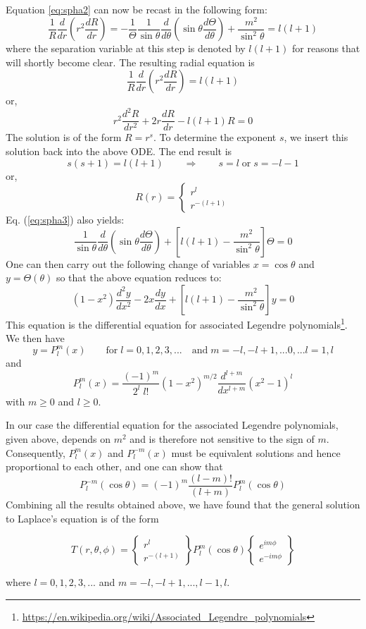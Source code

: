 Equation \ref{eq:spha2} can now be recast in the following form:
\begin{equation}
 \frac{1}{R} \frac{d}{dr} \left( r^2 \frac{dR}{dr} \right) 
= 
-\frac{1}{\Theta}\frac{1}{\sin\theta} \frac{d}{d\theta} \left( \sin \theta \frac{d\Theta}{d\theta} \right) 
+\frac{m^2}{\sin^2\theta} = l(l+1) \label{eq:spha3}
\end{equation}
where the separation variable at this step is denoted by $l(l + 1)$ for reasons that will shortly
become clear.
The resulting radial equation is 
\[
\frac{1}{R} \frac{d}{dr} \left( r^2 \frac{dR}{dr} \right)  = l(l+1)
\]
or, 
\[
r^2 \frac{d^2R}{dr^2} + 2 r \frac{dR}{dr} - l(l+1)R =0
\]
The solution is of the form $R=r^s$. To determine the exponent $s$, 
we insert this solution back into the above ODE. The end result is
\[
s(s+1)=l(l+1) \qquad \Rightarrow \qquad s=l \; \text{or} \; s=-l-1
\]
or, 
\[
R(r) = 
\left\{
\begin{array}{c}
r^l \\ r^{-(l+1)}
\end{array}
\right.
\]
Eq. (\ref{eq:spha3}) also yields:
\[
\frac{1}{\sin\theta} \frac{d}{d\theta} \left( \sin\theta \frac{d\Theta}{d\theta} \right) 
+
\left[ l(l+1) - \frac{m^2}{\sin^2\theta} \right] \Theta = 0
\]
One can then carry out the following change of variables $x=\cos\theta$ and $y=\Theta(\theta)$ so that 
the above equation reduces to:
\[
(1-x^2) \frac{d^2 y}{d x^2} - 2x \frac{dy}{dx} + 
\left[ l(l+1)-\frac{m^2}{\sin^2\theta} \right] y =0
\]
This equation is the differential equation for associated Legendre 
polynomials\footnote{\url{https://en.wikipedia.org/wiki/Associated_Legendre_polynomials}}.
We then have
\[
y=P_l^m(x) \qquad \text{for} \; l=0,1,2,3,... \quad \text{and} \; m=-l,-l+1,...0,...l=1,l
\]
and 
\[
P_l^m(x)= \frac{(-1)^m}{2^l \; l!} (1-x^2)^{m/2}
\frac{d^{l+m}}{dx^{l+m}} (x^2-1)^l
\]
with $m \geq 0$ and $l\geq 0$.

In our case the differential equation for the associated Legendre polynomials, given above, depends
on $m^2$ and is therefore not sensitive to the sign of $m$.
Consequently, $P_l^m(x)$ and $P_l^{-m}(x)$ must be equivalent solutions and 
hence proportional to each other, and one can show that
\begin{equation}
P_l^{-m}(\cos\theta) = (-1)^m\frac{(l-m)!}{(l+m)} P_l^m(\cos\theta)
\label{eq:spha4}
\end{equation}
Combining all the results obtained above, we have found that the general solution to
Laplace’s equation is of the form
\begin{mdframed}[backgroundcolor=blue!5]
\[
T(r,\theta,\phi) = 
\left\{
\begin{array}{c}
r^l \\ r^{-(l+1)}
\end{array}
\right\}
P_l^m(\cos\theta) 
\left\{
\begin{array}{c}
e^{im\phi} \\ e^{-im\phi}
\end{array}
\right\}
\]
\end{mdframed}
where $l=0,1,2,3,...$ and $m=-l,-l+1,...,l-1,l$.

